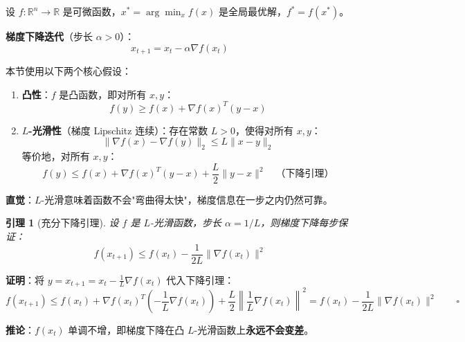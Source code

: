 \documentclass[12pt, a4paper]{ctexart}
\newtheorem{lemma}[theorem]{引理}
\begin{document}
\begin{blackboard}[基本假设与记号]

设 $f: \mathbb{R}^n \to \mathbb{R}$ 是可微函数，$x^* = \arg\min_x f(x)$ 是全局最优解，$f^* = f(x^*)$。

\textbf{梯度下降迭代}（步长 $\alpha > 0$）：
\[
    x_{t+1} = x_t - \alpha \nabla f(x_t)
\]

本节使用以下两个核心假设：

\begin{enumerate}
    \item \textbf{凸性}：$f$ 是凸函数，即对所有 $x, y$：
    \[
        f(y) \geq f(x) + \nabla f(x)^T (y - x)
    \]
    \item \textbf{$L$-光滑性}（梯度 Lipschitz 连续）：存在常数 $L > 0$，使得对所有 $x, y$：
    \[
        \|\nabla f(x) - \nabla f(y)\|_2 \leq L \|x - y\|_2
    \]
    等价地，对所有 $x, y$：
    \[
        f(y) \leq f(x) + \nabla f(x)^T(y - x) + \frac{L}{2}\|y - x\|^2
        \quad \text{（下降引理）}
    \]
\end{enumerate}

\textbf{直觉}：$L$-光滑意味着函数不会"弯曲得太快"，梯度信息在一步之内仍然可靠。

\end{blackboard}

\begin{blackboard}[关键引理]

\begin{lemma}[充分下降引理]
设 $f$ 是 $L$-光滑函数，步长 $\alpha = 1/L$，则梯度下降每步保证：
\[
    f(x_{t+1}) \leq f(x_t) - \frac{1}{2L}\|\nabla f(x_t)\|^2
\]
\end{lemma}

\textbf{证明}：将 $y = x_{t+1} = x_t - \frac{1}{L}\nabla f(x_t)$ 代入下降引理：
\[
    f(x_{t+1}) \leq f(x_t) + \nabla f(x_t)^T\!\left(-\frac{1}{L}\nabla f(x_t)\right)
    + \frac{L}{2}\left\|\frac{1}{L}\nabla f(x_t)\right\|^2
    = f(x_t) - \frac{1}{2L}\|\nabla f(x_t)\|^2 \qquad \square
\]

\textbf{推论}：$f(x_t)$ 单调不增，即梯度下降在凸 $L$-光滑函数上\textbf{永远不会变差}。

\end{blackboard}
\end{document}
